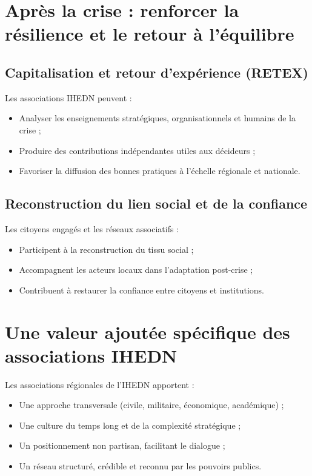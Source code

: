 \documentclass[12pt,a4paper]{article}
\begin{document}
\section{Après la crise : renforcer la résilience et le retour à l'équilibre}

\subsection{Capitalisation et retour d'expérience (RETEX)}

Les associations IHEDN peuvent :
\begin{itemize}
    \item Analyser les enseignements stratégiques, organisationnels et humains de la crise ;
    \item Produire des contributions indépendantes utiles aux décideurs ;
    \item Favoriser la diffusion des bonnes pratiques à l'échelle régionale et nationale.
\end{itemize}

\subsection{Reconstruction du lien social et de la confiance}

Les citoyens engagés et les réseaux associatifs :
\begin{itemize}
    \item Participent à la reconstruction du tissu social ;
    \item Accompagnent les acteurs locaux dans l'adaptation post-crise ;
    \item Contribuent à restaurer la confiance entre citoyens et institutions.
\end{itemize}

\section{Une valeur ajoutée spécifique des associations IHEDN}

Les associations régionales de l'IHEDN apportent :
\begin{itemize}
    \item Une approche transversale (civile, militaire, économique, académique) ;
    \item Une culture du temps long et de la complexité stratégique ;
    \item Un positionnement non partisan, facilitant le dialogue ;
    \item Un réseau structuré, crédible et reconnu par les pouvoirs publics.
\end{itemize}
\end{document}
